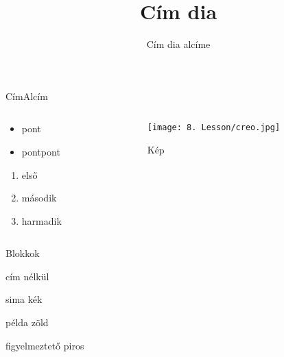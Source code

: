 \documentclass[aspectratio=169, xcolor=table]{beamer}
\begin{document}
    \begin{frame}
        \title{Cím dia}
        \subtitle{Cím dia alcíme}
        
        \maketitle
    \end{frame}

    \begin{frame}{Cím}{Alcím}
        \begin{columns}[t]
            \begin{column}{.5\linewidth}
                \begin{itemize}
                    \item pont
                    \item pontpont
                \end{itemize}
                
                \begin{enumerate}
                    \item első
                    \item második
                    \item harmadik
                \end{enumerate}
            \end{column}
            
            \begin{column}{.5\linewidth}
                \begin{figure}
                    \texttt{[image: 8. Lesson/creo.jpg]}
                    \caption{Kép}
                \end{figure}
            \end{column}
        \end{columns}
    \end{frame}
    
    \begin{frame}{Blokkok}
        \begin{block}
            cím nélkül
        \end{block}
        
        \begin{block}{sima}
            kék
        \end{block}
        
        \begin{exampleblock}{példa}
            zöld
        \end{exampleblock}
        
        \begin{alertblock}{figyelmeztető}
            piros
        \end{alertblock}
    \end{frame}
    
\end{document}
